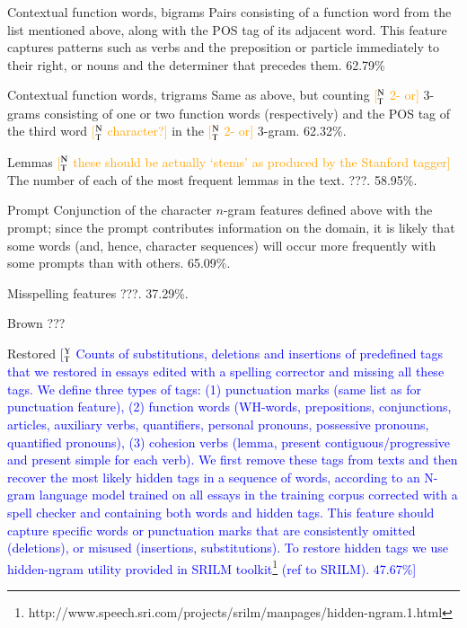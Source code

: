 \documentclass[11pt,letterpaper]{article}
\newcommand{\ensuretext}[1]{#1}
\newcommand{\ytmarker}{\ensuretext{\textcolor{blue}{\ensuremath{^{\textsc{Y}}_{\textsc{T}}}}}}
\newcommand{\ntmarker}{\ensuretext{\textcolor{green}{\ensuremath{^{\textsc{N}}_{\textsc{T}}}}}}
\newcommand{\arkcomment}[3]{\ensuretext{\textcolor{#3}{[#1 #2]}}}
\newcommand{\yt}[1]{\arkcomment{\ytmarker}{#1}{blue}}
\newcommand{\nt}[1]{\arkcomment{\ntmarker}{#1}{orange}}
\begin{document}
\begin{compactdesc}
\item[Contextual function words, bigrams] Pairs consisting of a
  function word from the list mentioned above, along with the POS tag
  of its adjacent word. This feature captures patterns such as verbs
  and the preposition or particle immediately to their right, or nouns
  and the determiner that precedes them. 62.79\%
\item[Contextual function words, trigrams] Same as above, but counting
  \nt{2- or} 3-grams consisting of one or two function words (respectively) and the POS tag of the third word \nt{character?} in the \nt{2- or} 3-gram. 62.32\%.
\item[Lemmas] \nt{these should be actually `stems' as produced by the Stanford tagger} The number of each of the most frequent lemmas in the
  text. ???. 58.95\%.
\item[Prompt] Conjunction of the character $n$-gram features defined
  above with the prompt; since the prompt contributes information on
  the domain, it is likely that some words (and, hence, character
  sequences) will occur more frequently with some prompts than with
  others. 65.09\%.
\item[Misspelling features] ???. 37.29\%.
\item[Brown] ???
\item[Restored] \yt{Counts of substitutions, deletions and insertions of predefined tags that we restored in essays edited with a spelling  corrector and missing all these tags. We define three types of tags: (1) punctuation marks (same list as for punctuation feature), (2) function words (WH-words, prepositions, conjunctions, articles, auxiliary verbs, quantifiers, personal pronouns, possessive pronouns, quantified pronouns), (3) cohesion verbs (lemma, present contiguous/progressive and present simple for each verb). We first remove these tags from texts and then recover the most likely hidden tags in a sequence of words, according to an N-gram language model trained on all essays in the training corpus corrected with a spell checker and containing both words and hidden tags. This feature should capture specific words or punctuation marks that are consistently omitted (deletions), or misused (insertions, substitutions).  To restore hidden tags we use hidden-ngram utility provided in SRILM toolkit\footnote{http://www.speech.sri.com/projects/srilm/manpages/hidden-ngram.1.html} (ref to SRILM). 47.67\%}


\end{compactdesc}
\end{document}
